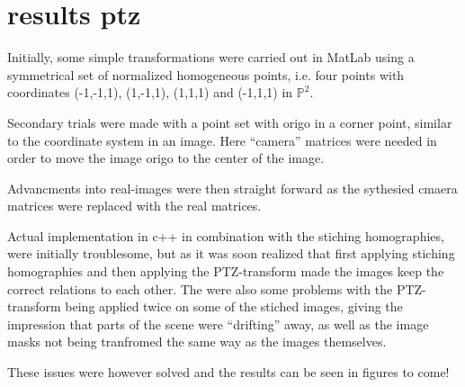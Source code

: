 \section{results ptz}
Initially, some simple transformations were carried out in MatLab using a symmetrical set of normalized homogeneous points, i.e. four points with coordinates (-1,-1,1), (1,-1,1), (1,1,1) and (-1,1,1) in $\mathbb{P}^2$. 

Secondary trials were made with a point set with origo in a corner point, similar to the coordinate system in an image. Here ``camera'' matrices were needed in order to move the image origo to the center of the image. 

Advancments into real-images were then straight forward as the sythesied cmaera matrices were replaced with the real matrices. 

Actual implementation in c++ in combination with the stiching homographies, were initially troublesome, but as it was soon realized that first applying stiching homographies and then applying the PTZ-transform made the images keep the correct relations to each other. The were also some problems with the PTZ-transform being applied twice on some of the stiched images, giving the impression that parts of the scene were ``drifting'' away, as well as the image masks not being tranfromed the same way as the images themselves.

These issues were however solved and the results can be seen in figures to come!
